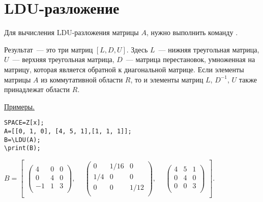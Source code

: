 
\section{ LDU-разложение} 
Для вычисления LDU-разложения матрицы $A$, нужно выполнить команду 
 . 

Результат~--- это три матриц $[L,D,U]$. Здесь $L$~--- нижняя треугольная матрица, $U$~--- верхняя треугольная матрица, 
$D$~--- матрица перестановок, умноженная на матрицу, которая является обратной к диагональной матрице. 
Если элементы матрицы $A$ из коммутативной области $R$, то и элементы матриц $L$, $D^{-1}$, $U$ также принадлежат области $R$.

\underline{Примеры. }

\vspace*{-2mm}
\begin{verbatim}
SPACE=Z[x]; 
A=[[0, 1, 0], [4, 5, 1],[1, 1, 1]];
B=\LDU(A);
\print(B);
\end{verbatim}

{$B = \left[\begin{array}{ccc}
 \left(\begin{array}{ccc}
  4& 0&  0\\
  0& 4& 0\\
  -1& 1&  3\\
\end{array}\right),\ &\ 
\left(\begin{array}{ccc}
  0&1/16 &      0\\
  1/4& 0& 0\\
  0& 0&   1/12\\
\end{array}\right),\ &\ 
\left(\begin{array}{ccc}
  4& 5&  1\\
  0& 4& 0\\
  0& 0& 3\\
\end{array}\right) 
 \end{array}\right].$
} 


